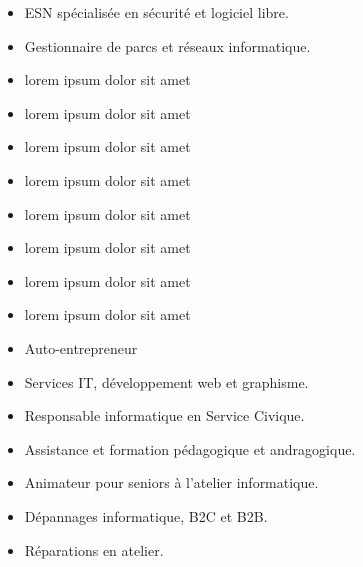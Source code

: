 \documentclass[10pt,a4paper,ragged2e,withhyper,normalphoto]{altacv}
\begin{document}
\begin{paracol}{2}

\begin{itemize}
\item ESN spécialisée en sécurité et logiciel libre.
\item Gestionnaire de parcs et réseaux informatique.
\item lorem ipsum dolor sit amet
\item lorem ipsum dolor sit amet
\item lorem ipsum dolor sit amet
\item lorem ipsum dolor sit amet
\item lorem ipsum dolor sit amet
\item lorem ipsum dolor sit amet
\item lorem ipsum dolor sit amet
\item lorem ipsum dolor sit amet
\end{itemize}

\divider

\begin{itemize}
\item Auto-entrepreneur
\item Services IT, développement web et graphisme.
\end{itemize}

\divider

\begin{itemize}
\item Responsable informatique en Service Civique.
\item Assistance et formation pédagogique et andragogique.
\end{itemize}

\switchcolumn

\begin{itemize}
\item Animateur pour seniors à l'atelier informatique.
\end{itemize}

\divider

\begin{itemize}
\item Dépannages informatique, B2C et B2B.
\item Réparations en atelier.
\end{itemize}


\end{paracol}
\end{document}
